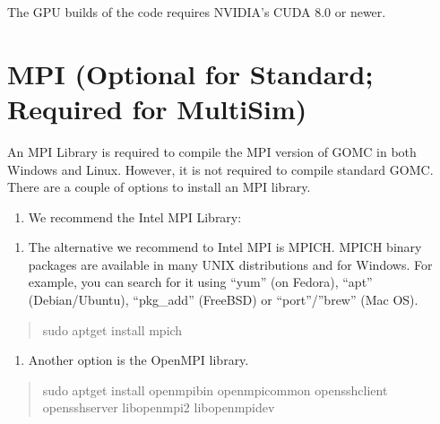 \documentclass[letterpaper,10pt,english]{sphinxmanual}
\begin{document}
\sphinxAtStartPar
The GPU builds of the code requires NVIDIA’s CUDA 8.0 or newer.


\section{MPI (Optional for Standard; Required for MultiSim)}
\label{\detokenize{software_requirements:mpi-optional-for-standard-required-for-multisim}}
\sphinxAtStartPar
An MPI Library is required to compile the MPI version of GOMC in both Windows and Linux.  However, it is not required to compile standard GOMC.  There are a couple of options to install an MPI library.
\begin{enumerate}
%
\item {} 
\sphinxAtStartPar
We recommend the Intel MPI Library:

\end{enumerate}
\begin{quote}

\sphinxAtStartPar
{}
\end{quote}
\begin{enumerate}
%
\setcounter{enumi}{1}
\item {} 
\sphinxAtStartPar
The alternative we recommend to Intel MPI is MPICH. MPICH binary packages are available in many UNIX distributions and for Windows. For example, you can search for it using “yum” (on Fedora), “apt” (Debian/Ubuntu), “pkg\_add” (FreeBSD) or “port”/”brew” (Mac OS).

\end{enumerate}
\begin{quote}

\begin{sphinxVerbatim}[commandchars=\\\{\}]
\PYGZdl{} sudo apt\PYGZhy{}get install mpich
\end{sphinxVerbatim}
\end{quote}
\begin{enumerate}
%
\setcounter{enumi}{2}
\item {} 
\sphinxAtStartPar
Another option is the OpenMPI library.

\end{enumerate}
\begin{quote}

\begin{sphinxVerbatim}[commandchars=\\\{\}]
\PYGZdl{} sudo apt\PYGZhy{}get install openmpi\PYGZhy{}bin openmpi\PYGZhy{}common openssh\PYGZhy{}client openssh\PYGZhy{}server libopenmpi2 libopenmpi\PYGZhy{}dev
\end{sphinxVerbatim}
\end{quote}
\end{document}
